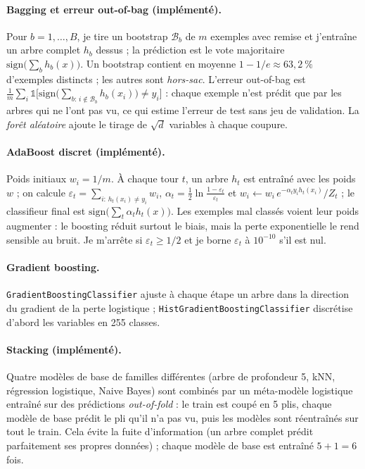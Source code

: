 \documentclass[11pt,a4paper]{article}
\begin{document}
\paragraph{Bagging et erreur out-of-bag (implémenté).} Pour $b=1,\dots,B$, je tire un bootstrap $\mathcal B_b$ de $m$ exemples avec remise et j'entraîne un arbre complet $h_b$ dessus ;
la prédiction est le vote majoritaire $\mathrm{sign}\big(\sum_b h_b(x)\big)$. Un bootstrap contient en moyenne $1-1/e\approx 63{,}2~\%$ d'exemples distincts ; les autres sont
\emph{hors-sac}. L'erreur out-of-bag est $\frac1m\sum_i \mathbb 1\big[\mathrm{sign}\big(\sum_{b:\,i\notin\mathcal B_b}h_b(x_i)\big)\neq y_i\big]$ : chaque exemple n'est prédit que par les arbres qui ne
l'ont pas vu, ce qui estime l'erreur de test sans jeu de validation. La \emph{forêt aléatoire} ajoute le tirage de $\sqrt d$ variables à chaque coupure.

\paragraph{AdaBoost discret (implémenté).} Poids initiaux $w_i=1/m$. À chaque tour $t$, un arbre $h_t$ est entraîné avec les poids $w$ ; on calcule
$\varepsilon_t=\sum_{i:\,h_t(x_i)\ne y_i}w_i$, $\alpha_t=\tfrac12\ln\frac{1-\varepsilon_t}{\varepsilon_t}$ et $w_i\leftarrow w_i\,e^{-\alpha_t y_ih_t(x_i)}/Z_t$ ; le classifieur final est $\mathrm{sign}\big(\sum_t\alpha_t h_t(x)\big)$.
Les exemples mal classés voient leur poids augmenter : le boosting réduit surtout le biais, mais la perte exponentielle le rend sensible au bruit. Je m'arrête si $\varepsilon_t\ge 1/2$ et je borne $\varepsilon_t$ à $10^{-10}$ s'il est nul.

\paragraph{Gradient boosting.} \texttt{GradientBoostingClassifier} ajuste à chaque étape un arbre dans la direction du gradient de la perte logistique ; \texttt{HistGradientBoostingClassifier} discrétise d'abord les variables en 255 classes.

\paragraph{Stacking (implémenté).} Quatre modèles de base de familles différentes (arbre de profondeur 5, kNN, régression logistique, Naive Bayes) sont combinés par un méta-modèle logistique entraîné sur des
prédictions \emph{out-of-fold} : le train est coupé en 5 plis, chaque modèle de base prédit le pli qu'il n'a pas vu, puis les modèles sont réentraînés sur tout le train. Cela évite la fuite d'information (un arbre complet prédit parfaitement ses propres
données) ; chaque modèle de base est entraîné $5+1=6$ fois.
\end{document}
